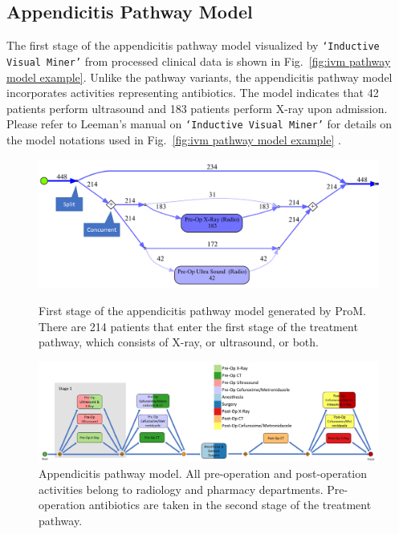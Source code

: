 \documentclass{elsarticle}
\begin{document}
\subsection{Appendicitis Pathway Model}
The first stage of the appendicitis pathway model visualized by \texttt{`Inductive Visual Miner'} from processed clinical data is shown in Fig.~\ref{fig:ivm pathway model example}. Unlike the pathway variants, the appendicitis pathway model incorporates activities representing antibiotics. The model indicates that 42 patients perform ultrasound and 183 patients perform X-ray upon admission. Please refer to Leeman's manual on \texttt{`Inductive Visual Miner'} for details on the model notations used in  Fig.~\ref{fig:ivm pathway model example} \cite{leemansinductive}.

\begin{figure}[t]
\includegraphics[width=\textwidth]{images/ivm_appendicitis_first_stage_example.png}
\caption{First stage of the appendicitis pathway model generated by ProM. There are 214 patients that enter the first stage of the treatment pathway, which consists of X-ray, or ultrasound, or both.}
\label{fig:ivm pathway model example}

\includegraphics[width=\textwidth]{images/communicative_appendicitis_process_models_anes.jpg}
\caption{Appendicitis pathway model. All pre-operation and post-operation activities belong to radiology and pharmacy departments. Pre-operation antibiotics are taken in the second stage of the treatment pathway.}
\label{fig:appendicitis pathway model}
\end{figure}
\end{document}
